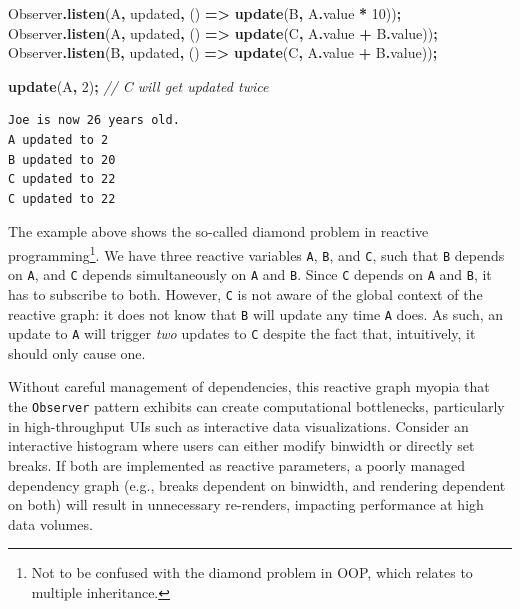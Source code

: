 \documentclass[
  openany]{book}
\newenvironment{Shaded}{\begin{snugshade}}{\end{snugshade}}
\newcommand{\AttributeTok}[1]{\textcolor[rgb]{0.13,0.29,0.53}{#1}}
\newcommand{\CommentTok}[1]{\textcolor[rgb]{0.56,0.35,0.01}{\textit{#1}}}
\newcommand{\DecValTok}[1]{\textcolor[rgb]{0.00,0.00,0.81}{#1}}
\newcommand{\FunctionTok}[1]{\textcolor[rgb]{0.13,0.29,0.53}{\textbf{#1}}}
\newcommand{\KeywordTok}[1]{\textcolor[rgb]{0.13,0.29,0.53}{\textbf{#1}}}
\newcommand{\NormalTok}[1]{#1}
\newcommand{\OperatorTok}[1]{\textcolor[rgb]{0.81,0.36,0.00}{\textbf{#1}}}
\newcommand{\VerbatimStringTok}[1]{\textcolor[rgb]{0.31,0.60,0.02}{#1}}
\theoremstyle{definition}
\theoremstyle{definition}
\theoremstyle{definition}
\theoremstyle{definition}
\theoremstyle{remark}
\begin{document}
\begin{Shaded}
\begin{Highlighting}[]
\NormalTok{Observer}\OperatorTok{.}\FunctionTok{listen}\NormalTok{(A}\OperatorTok{,} \VerbatimStringTok{\textasciigrave{}updated\textasciigrave{}}\OperatorTok{,}\NormalTok{ () }\KeywordTok{=\textgreater{}} \FunctionTok{update}\NormalTok{(B}\OperatorTok{,}\NormalTok{ A}\OperatorTok{.}\AttributeTok{value} \OperatorTok{*} \DecValTok{10}\NormalTok{))}\OperatorTok{;}
\NormalTok{Observer}\OperatorTok{.}\FunctionTok{listen}\NormalTok{(A}\OperatorTok{,} \VerbatimStringTok{\textasciigrave{}updated\textasciigrave{}}\OperatorTok{,}\NormalTok{ () }\KeywordTok{=\textgreater{}} \FunctionTok{update}\NormalTok{(C}\OperatorTok{,}\NormalTok{ A}\OperatorTok{.}\AttributeTok{value} \OperatorTok{+}\NormalTok{ B}\OperatorTok{.}\AttributeTok{value}\NormalTok{))}\OperatorTok{;}
\NormalTok{Observer}\OperatorTok{.}\FunctionTok{listen}\NormalTok{(B}\OperatorTok{,} \VerbatimStringTok{\textasciigrave{}updated\textasciigrave{}}\OperatorTok{,}\NormalTok{ () }\KeywordTok{=\textgreater{}} \FunctionTok{update}\NormalTok{(C}\OperatorTok{,}\NormalTok{ A}\OperatorTok{.}\AttributeTok{value} \OperatorTok{+}\NormalTok{ B}\OperatorTok{.}\AttributeTok{value}\NormalTok{))}\OperatorTok{;}

\FunctionTok{update}\NormalTok{(A}\OperatorTok{,} \DecValTok{2}\NormalTok{)}\OperatorTok{;} \CommentTok{// C will get updated twice}
\end{Highlighting}
\end{Shaded}

\begin{verbatim}
Joe is now 26 years old.
A updated to 2
B updated to 20
C updated to 22
C updated to 22
\end{verbatim}

The example above shows the so-called diamond problem in reactive programming\footnote{Not to be confused with the diamond problem in OOP, which relates to multiple inheritance.}. We have three reactive variables \texttt{A}, \texttt{B}, and \texttt{C}, such that \texttt{B} depends on \texttt{A}, and \texttt{C} depends simultaneously on \texttt{A} and \texttt{B}. Since \texttt{C} depends on \texttt{A} and \texttt{B}, it has to subscribe to both. However, \texttt{C} is not aware of the global context of the reactive graph: it does not know that \texttt{B} will update any time \texttt{A} does. As such, an update to \texttt{A} will trigger \emph{two} updates to \texttt{C} despite the fact that, intuitively, it should only cause one.

Without careful management of dependencies, this reactive graph myopia that the \texttt{Observer} pattern exhibits can create computational bottlenecks, particularly in high-throughput UIs such as interactive data visualizations. Consider an interactive histogram where users can either modify binwidth or directly set breaks. If both are implemented as reactive parameters, a poorly managed dependency graph (e.g., breaks dependent on binwidth, and rendering dependent on both) will result in unnecessary re-renders, impacting performance at high data volumes.
\end{document}
